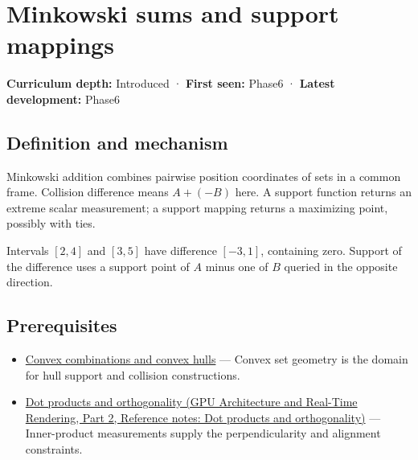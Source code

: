 \hypertarget{appendix-215ac7099a82}{}\label{referencestart:appendix-215ac7099a82}
\section{Minkowski sums and support mappings}\label{appendix-215ac7099a82-minkowski-sums-and-support-mappings}

\hypertarget{appendix-215ac7099a82-minkowski-sums-and-support-mappings}{}

\textbf{Curriculum depth:} Introduced · \textbf{First seen:} Phase6 · \textbf{Latest development:} Phase6

\begin{allmightroledefinition}

\subsection{Definition and mechanism}\label{appendix-215ac7099a82-definition-and-mechanism}

\hypertarget{appendix-215ac7099a82-definition-and-mechanism}{}

Minkowski addition combines pairwise position coordinates of sets in a common frame. Collision difference means \(A+(-B)\) here. A support function returns an extreme scalar measurement; a support mapping returns a maximizing point, possibly with ties.

\end{allmightroledefinition}

Intervals \([2,4]\) and \([3,5]\) have difference \([-3,1]\), containing zero. Support of the difference uses a support point of \(A\) minus one of \(B\) queried in the opposite direction.

\subsection{Prerequisites}\label{appendix-215ac7099a82-prerequisites}

\hypertarget{appendix-215ac7099a82-prerequisites}{}

\begin{itemize}
\tightlist
\item
  \hyperref[appendix-0026ec42c9d5]{Convex combinations and convex hulls} --- Convex set geometry is the domain for hull support and collision constructions.
\item
  \href{../06-GPU-Architecture-and-Real-Time-Rendering-P02/main.pdf\#nameddest=appendix-8bc4e8fc547c}{Dot products and orthogonality (GPU Architecture and Real-Time Rendering, Part 2, Reference notes: Dot products and orthogonality)} --- Inner-product measurements supply the perpendicularity and alignment constraints.
\end{itemize}

